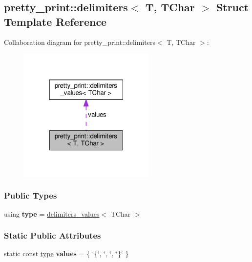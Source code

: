 \hypertarget{structpretty__print_1_1delimiters}{}\subsection{pretty\+\_\+print\+:\+:delimiters$<$ T, T\+Char $>$ Struct Template Reference}
\label{structpretty__print_1_1delimiters}


Collaboration diagram for pretty\+\_\+print\+:\+:delimiters$<$ T, T\+Char $>$\+:
\nopagebreak
\begin{figure}[H]
\begin{center}
\leavevmode
\includegraphics[width=193pt]{structpretty__print_1_1delimiters__coll__graph}
\end{center}
\end{figure}
\subsubsection*{Public Types}
\begin{DoxyCompactItemize}
\item 
using {\bfseries type} = \hyperlink{structpretty__print_1_1delimiters__values}{delimiters\+\_\+values}$<$ T\+Char $>$\hypertarget{structpretty__print_1_1delimiters_a910c8cec995b089e2b36dd2f05d32e66}{}\label{structpretty__print_1_1delimiters_a910c8cec995b089e2b36dd2f05d32e66}

\end{DoxyCompactItemize}
\subsubsection*{Static Public Attributes}
\begin{DoxyCompactItemize}
\item 
static const \hyperlink{structpretty__print_1_1delimiters__values}{type} {\bfseries values} = \{ \char`\"{}\{\char`\"{}, \char`\"{}, \char`\"{}, \char`\"{}\}\char`\"{} \}\hypertarget{structpretty__print_1_1delimiters_a5755b097e2266e0119ac5819ad88cd45}{}\label{structpretty__print_1_1delimiters_a5755b097e2266e0119ac5819ad88cd45}

\end{DoxyCompactItemize}


